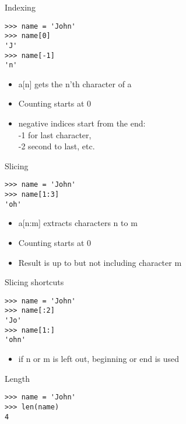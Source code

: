 \documentclass[aspectratio=169,usenames,dvipsnames]{beamer}
\begin{document}
\begin{frame}[fragile]{Indexing}
\begin{lstlisting}
>>> name = 'John'
>>> name[0]
'J'
>>> name[-1]
'n'
\end{lstlisting}
    \begin{itemize}
        \item a[n] gets the n'th character of a
        \item Counting starts at 0
        \item negative indices start from the end:\\
			-1 for last character, \\
            -2 second to last, etc.
    \end{itemize}
\end{frame}

\begin{frame}[fragile]{Slicing}
\begin{lstlisting}
>>> name = 'John'
>>> name[1:3]
'oh'
\end{lstlisting}
    \begin{itemize}
        \item a[n:m] extracts characters n to m
        \item Counting starts at 0
        \item Result is up to but not including character m
    \end{itemize}
\end{frame}

\begin{frame}[fragile]{Slicing shortcuts}
\begin{lstlisting}
>>> name = 'John'
>>> name[:2]
'Jo'
>>> name[1:]
'ohn'
\end{lstlisting}
    \begin{itemize}
        \item if n or m is left out, beginning or end is used
    \end{itemize}
\end{frame}

\begin{frame}[fragile]{Length}
\begin{lstlisting}
>>> name = 'John'
>>> len(name)
4
\end{lstlisting}
\end{frame}
\end{document}
